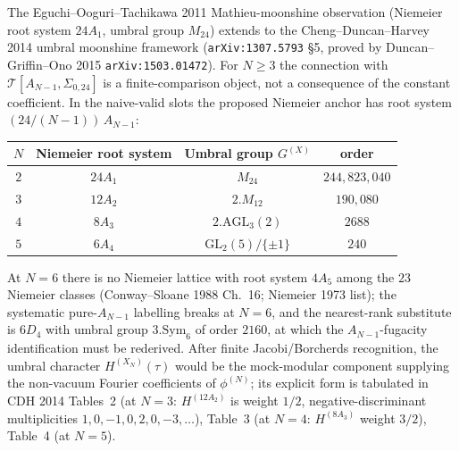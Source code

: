 \begin{remark}
\label{rem:wa-umbral}
The Eguchi--Ooguri--Tachikawa 2011 Mathieu-moonshine observation
(Niemeier root system $24 A_1$, umbral group $M_{24}$) extends to
the Cheng--Duncan--Harvey 2014 umbral moonshine framework
(\texttt{arXiv:1307.5793} \S 5, proved by Duncan--Griffin--Ono 2015
\texttt{arXiv:1503.01472}). For $N\ge 3$ the connection with
$\mathcal T[A_{N-1}, \Sigma_{0,24}]$ is a finite-comparison object,
not a consequence of the constant coefficient. In the naive-valid
slots the proposed Niemeier anchor has root system
$(24/(N-1))\,A_{N-1}$:
\begin{center}
\begin{tabular}{c|ccc}
$N$ & Niemeier root system & Umbral group $G^{(X)}$ & order \\\hline
$2$ & $24 A_1$ & $M_{24}$ & $244{,}823{,}040$ \\
$3$ & $12 A_2$ & $2.M_{12}$ & $190{,}080$ \\
$4$ & $8 A_3$ & $2.\mathrm{AGL}_3(2)$ & $2688$ \\
$5$ & $6 A_4$ & $\mathrm{GL}_2(5)/\{\pm 1\}$ & $240$ \\
\end{tabular}
\end{center}
At $N = 6$ there is no Niemeier lattice with root system $4 A_5$
among the $23$ Niemeier classes (Conway--Sloane 1988 Ch.\ 16;
Niemeier 1973 list); the systematic pure-$A_{N-1}$ labelling
breaks at $N = 6$, and the nearest-rank substitute is $6 D_4$ with
umbral group $3.\mathrm{Sym}_6$ of order $2160$, at which the
$A_{N-1}$-fugacity identification must be rederived. After finite
Jacobi/Borcherds recognition, the umbral character
$H^{(X_N)}(\tau)$ would be the mock-modular component supplying the
non-vacuum Fourier coefficients of $\phi^{(N)}$;
its explicit form is tabulated in CDH 2014 Tables~2 (at $N=3$:
$H^{(12A_2)}$ is weight $1/2$, negative-discriminant multiplicities
$1, 0, -1, 0, 2, 0, -3, \ldots$), Table~3 (at $N=4$: $H^{(8A_3)}$
weight $3/2$), Table~4 (at $N=5$).
\end{remark}

